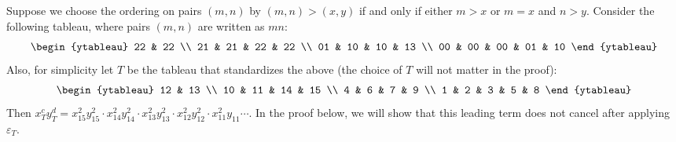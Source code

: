 \begin{example}\label{ex:horz-strips}
	Suppose we choose the ordering on pairs $(m,n)$ by $(m,n)>(x,y)$ if and only if either $m>x$ or $m=x$ and $n>y$.  Consider the following tableau, where pairs $(m,n)$ are written as $mn$:
	$$\begin{ytableau}
	22 & 22 \\
	21 & 21 & 22 & 22 \\
	01 & 10 & 10 & 13 \\
	00 & 00 & 00 & 01 & 10
	\end{ytableau}$$
	Also, for simplicity let $T$ be the tableau that standardizes the above (the choice of $T$ will not matter in the proof): 
	$$\begin{ytableau}
	12 & 13 \\ 
	10 & 11 & 14 & 15 \\
	4 &  6 & 7  & 9 \\
	1 & 2 & 3 & 5 & 8
	\end{ytableau}$$
	Then $x_T^c y_T^d=x_{15}^2 y_{15}^2 \cdot x_{14}^2y_{14}^2\cdot x_{13}^2y_{13}^2\cdot x_{12}^2y_{12}^2\cdot x_{11}^2y_{11}\cdots $.  In the proof below, we will show that this leading term does not cancel after applying $\varepsilon_T$.
\end{example}


